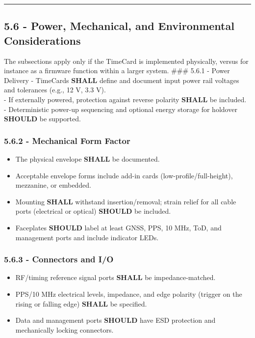 \documentclass[
]{article}
\begin{document}
\begin{center}\rule{0.5\linewidth}{0.5pt}\end{center}

\subsection{5.6 - Power, Mechanical, and Environmental
Considerations}\label{power-mechanical-and-environmental-considerations}

The subsections apply only if the TimeCard is implemented physically,
versus for instance as a firmware function within a larger system.
\#\#\# 5.6.1 - Power Delivery - TimeCards \textbf{SHALL} define and
document input power rail voltages and tolerances (e.g., 12 V, 3.3 V).\\
- If externally powered, protection against reverse polarity
\textbf{SHALL} be included.\\
- Deterministic power-up sequencing and optional energy storage for
holdover \textbf{SHOULD} be supported.

\subsubsection{5.6.2 - Mechanical Form
Factor}\label{mechanical-form-factor}

\begin{itemize}
\item
  The physical envelope \textbf{SHALL} be documented.\\
\item
  Acceptable envelope forms include add-in cards
  (low-profile/full-height), mezzanine, or embedded.\\
\item
  Mounting \textbf{SHALL} withstand insertion/removal; strain relief for
  all cable ports (electrical or optical) \textbf{SHOULD} be included.\\
\item
  Faceplates \textbf{SHOULD} label at least GNSS, PPS, 10 MHz, ToD, and
  management ports and include indicator LEDs.
\end{itemize}

\subsubsection{5.6.3 - Connectors and I/O}\label{connectors-and-io}

\begin{itemize}
\item
  RF/timing reference signal ports \textbf{SHALL} be
  impedance-matched.\\
\item
  PPS/10 MHz electrical levels, impedance, and edge polarity (trigger on
  the rising or falling edge) \textbf{SHALL} be specified.\\
\item
  Data and management ports \textbf{SHOULD} have ESD protection and
  mechanically locking connectors.
\end{itemize}
\end{document}
